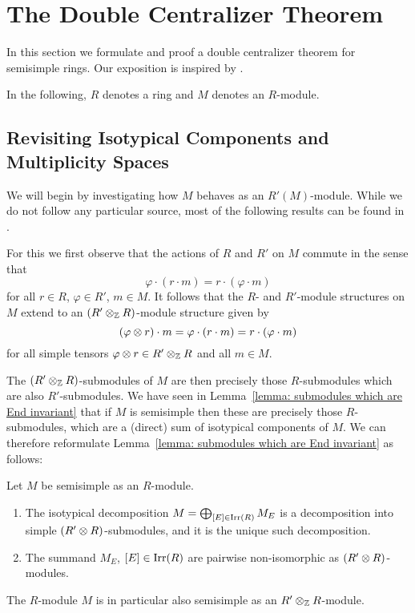 \section{The Double Centralizer Theorem}


\begin{fluff}
  In this section we formulate and proof a double centralizer theorem for semisimple rings.
  Our exposition is inspired by \cite{AP2012DoubleCommutant}.
\end{fluff}


\begin{conventions}
  In the following, $R$ denotes a ring and $M$ denotes an $R$-module.
\end{conventions}





\subsection{Revisiting Isotypical Components and Multiplicity Spaces}


\begin{fluff}
  We will begin by investigating how $M$ behaves as an $R'(M)$-module.
  While we do not follow any particular source, most of the following results can be found in \cite[Chapter~3.2]{DaSilva2017NonCommutative}.
  
  For this we first observe that the actions of $R$ and $R'$ on $M$ commute in the sense that
  \[
      \varphi \cdot (r \cdot m)
    = r \cdot (\varphi \cdot m)
  \]
  for all $r \in R$, $\varphi \in R'$, $m \in M$.
  It follows that the $R$- and $R'$-module structures on $M$ extend to an $(R' \mathbin{\otimes}_{\mathbb{Z}} R)$-module structure given by
  \[
      (\varphi \mathbin{\otimes} r) \cdot m
    = \varphi \cdot (r \cdot m)
    = r \cdot (\varphi \cdot m)
  \]
  for all simple tensors $\varphi \mathbin{\otimes} r \in R' \mathbin{\otimes}_{\mathbb{Z}} R$ and all $m \in M$.
  
  The $(R' \mathbin{\otimes}_{\mathbb{Z}} R)$-submodules of $M$ are then precisely those $R$-submodules which are also $R'$-submodules.
  We have seen in Lemma~\ref{lemma: submodules which are End invariant} that if $M$ is semisimple then these are precisely those $R$-submodules, which are a (direct) sum of isotypical components of $M$.
  We can therefore reformulate Lemma~\ref{lemma: submodules which are End invariant} as follows:
\end{fluff}


\begin{lemma}
  \label{lemma: unique decomposition into simple R' tensor R modules}
  Let $M$ be semisimple as an $R$-module.
  \begin{enumerate}
    \item
      The isotypical decomposition $M = \bigoplus_{[E] \in \operatorname{Irr}(R)} M_E$ is a decomposition into simple $(R' \mathbin{\otimes} R)$-submodules, and it is the unique such decomposition.
    \item
      The summand $M_E$, $[E] \in \operatorname{Irr}(R)$ are pairwise non-isomorphic as $(R' \mathbin{\otimes} R)$-modules.
  \end{enumerate}
  The $R$-module $M$ is in particular also semisimple as an $R' \otimes_{\mathbb{Z}} R$-module.
\end{lemma}


